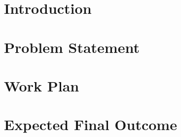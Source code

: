 \documentclass[conference]{IEEEtran}
\begin{document}
\section{Introduction}
\fontsize{10pt}{12pt}\selectfont
\label{sec:introduction}


\section{Problem Statement}
\fontsize{10pt}{12pt}\selectfont
\label{sec:problem_statement}


\section{Work Plan}
\fontsize{10pt}{12pt}\selectfont
\label{sec:work_plan}


\section{Expected Final Outcome}
\fontsize{10pt}{12pt}\selectfont
\label{sec:expected_final_outcome}





\fontsize{10pt}{12pt}\selectfont


\end{document}
